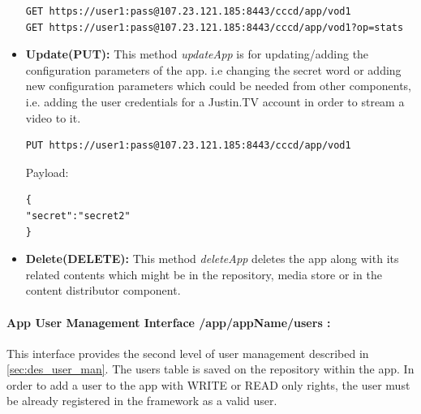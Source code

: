 \begin{itemize}
\begin{code}
\begin{verbatim}
GET https://user1:pass@107.23.121.185:8443/cccd/app/vod1
GET https://user1:pass@107.23.121.185:8443/cccd/app/vod1?op=stats
\end{verbatim}
\end{code}

\item \textbf{Update(PUT):}  This method \textit{updateApp} is for updating/adding the configuration parameters of the app. i.e changing the secret word or adding new configuration parameters which could be needed from other components, i.e. adding the user credentials for a Justin.TV account in order to stream a video to it.
\begin{code}
\begin{verbatim}
PUT https://user1:pass@107.23.121.185:8443/cccd/app/vod1
\end{verbatim}
Payload:
\begin{verbatim}
{
"secret":"secret2"
}
\end{verbatim}
\end{code}

\item \textbf{Delete(DELETE):} This method \textit{deleteApp} deletes the app along with its related contents which might be in the repository, media store or in the content distributor component.

\end{itemize}

\paragraph{App User Management Interface /app/appName/users :} This interface provides the second level of user management described in \ref{sec:des_user_man}. The users table is saved on the repository within the app. In order to add a user to the app with WRITE or READ only rights, the user must be already registered in the framework as a valid user.

